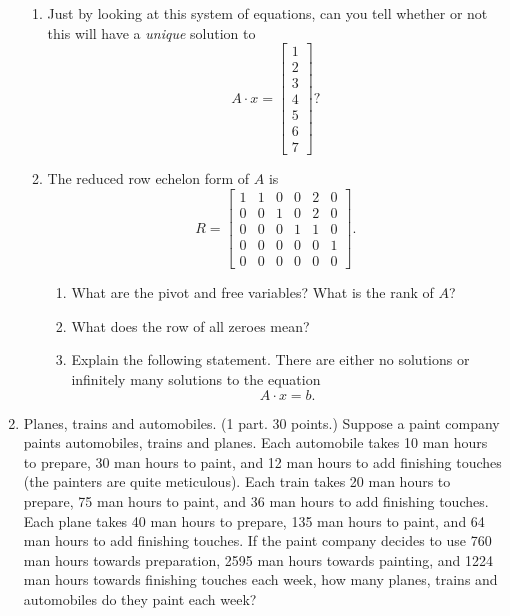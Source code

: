 \documentclass[10pt]{amsart}
\begin{document}
\begin{enumerate}
\begin{enumerate}
\item Just by looking at this system of equations, can you tell
whether or not this will have a {\em unique} solution to
$$
A\cdot x=\left[\begin{array}{c}1\\2\\3\\4\\5\\6\\7\end{array}\right]?
$$
\vfill\pagebreak
\item The reduced row echelon form of $A$ is
$$
R=\left[\begin{array}{rrrrrr}
1&1&0&0&2&0\\
0&0&1&0&2&0\\
0&0&0&1&1&0\\
0&0&0&0&0&1\\
0&0&0&0&0&0
	\end{array}\right].
$$
\begin{enumerate}
\item What are the pivot and free variables?  What is the rank of $A$?
\vfill
\item What does the row of all zeroes mean?
\vfill
\item Explain the following statement.  There are either no solutions or
infinitely many solutions to the equation
$$
A\cdot x=b.
$$
\end{enumerate}
\end{enumerate}



\vfill\pagebreak

\item {\sc Planes, trains and automobiles.} (1 part. 30 points.)
Suppose a paint company paints automobiles, trains and planes.  Each
automobile takes 10 man hours to prepare, 30 man hours to paint, and 12
man hours to add finishing touches (the painters are quite
meticulous).  Each train takes 20 man hours to prepare, 75 man hours to
paint, and 36 man hours to add finishing touches.  Each plane takes 40
man hours to prepare, 135 man hours to paint, and 64 man hours to add
finishing touches.  If the paint company decides to use 760 man hours
towards preparation, 2595 man hours towards painting, and 1224 man hours
towards finishing touches each week, how many planes, trains and
automobiles do they paint each week?

\vfill\pagebreak


\end{enumerate}
\end{document}
